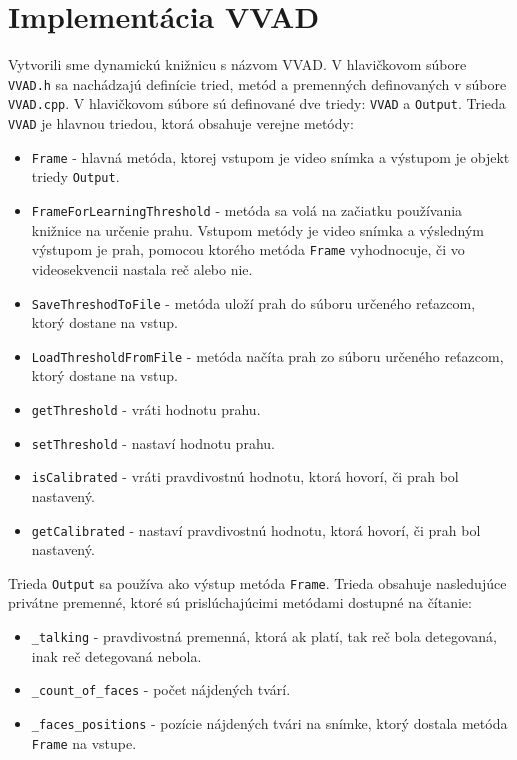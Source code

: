 \section{Implementácia VVAD}
Vytvorili sme dynamickú knižnicu s názvom VVAD. 
V hlavičkovom súbore \texttt{VVAD.h} sa nachádzajú definície tried, metód a premenných definovaných v súbore \texttt{VVAD.cpp}.
V hlavičkovom súbore sú definované dve triedy: \texttt{VVAD} a  \texttt{Output}.
Trieda \texttt{VVAD} je hlavnou triedou, ktorá obsahuje verejne metódy:
\begin{itemize}
\item \texttt{Frame} - hlavná metóda, ktorej vstupom je video snímka a výstupom je objekt triedy \texttt{Output}.
\item \texttt{FrameForLearningThreshold} - metóda sa volá na začiatku používania knižnice na určenie prahu. Vstupom metódy je video snímka a výsledným výstupom je prah, pomocou ktorého metóda \texttt{Frame} vyhodnocuje, či vo videosekvencii nastala reč alebo nie.
\item \texttt{SaveThreshodToFile} - metóda uloží prah do súboru určeného reťazcom, ktorý dostane na vstup.
\item \texttt{LoadThresholdFromFile} -  metóda načíta prah zo súboru určeného reťazcom, ktorý dostane na vstup.
\item \texttt{getThreshold} - vráti hodnotu prahu.
\item \texttt{setThreshold} - nastaví hodnotu prahu.
\item \texttt{isCalibrated} - vráti pravdivostnú hodnotu, ktorá hovorí, či prah bol nastavený.
\item \texttt{getCalibrated} - nastaví pravdivostnú hodnotu, ktorá hovorí, či prah bol nastavený.
\end{itemize}

Trieda  \texttt{Output} sa používa ako výstup metóda  \texttt{Frame}. Trieda obsahuje nasledujúce privátne premenné, ktoré sú prislúchajúcimi metódami dostupné na čítanie:
\begin{itemize}
\item \texttt{\_talking} - pravdivostná premenná, ktorá ak platí, tak reč bola detegovaná, inak reč detegovaná nebola.
\item \texttt{\_count\_of\_faces} - počet nájdených tvárí.
\item \texttt{\_faces\_positions} - pozície nájdených tvári na snímke, ktorý dostala metóda \texttt{Frame} na vstupe.
\end{itemize}

